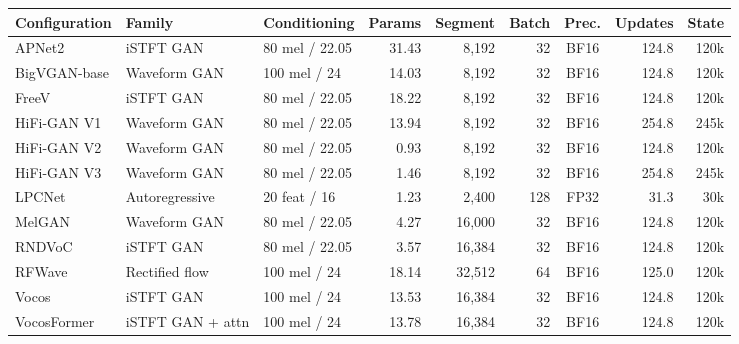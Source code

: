 \begin{tabular*}{\linewidth}{@{\extracolsep{\fill}}lllrrrcrr@{}}
  \toprule
  Configuration & Family & Conditioning & Params & Segment & Batch & Prec. & Updates & State \\
  \midrule
  APNet2 & iSTFT GAN & 80 mel / 22.05 & 31.43 & 8,192 & 32 & BF16 & 124.8 & 120k \\
  BigVGAN-base & Waveform GAN & 100 mel / 24 & 14.03 & 8,192 & 32 & BF16 & 124.8 & 120k \\
  FreeV & iSTFT GAN & 80 mel / 22.05 & 18.22 & 8,192 & 32 & BF16 & 124.8 & 120k \\
  HiFi-GAN V1 & Waveform GAN & 80 mel / 22.05 & 13.94 & 8,192 & 32 & BF16 & 254.8 & 245k \\
  HiFi-GAN V2 & Waveform GAN & 80 mel / 22.05 & 0.93 & 8,192 & 32 & BF16 & 124.8 & 120k \\
  HiFi-GAN V3 & Waveform GAN & 80 mel / 22.05 & 1.46 & 8,192 & 32 & BF16 & 254.8 & 245k \\
  LPCNet & Autoregressive & 20 feat / 16 & 1.23 & 2,400 & 128 & FP32 & 31.3 & 30k \\
  MelGAN & Waveform GAN & 80 mel / 22.05 & 4.27 & 16,000 & 32 & BF16 & 124.8 & 120k \\
  RNDVoC & iSTFT GAN & 80 mel / 22.05 & 3.57 & 16,384 & 32 & BF16 & 124.8 & 120k \\
  RFWave & Rectified flow & 100 mel / 24 & 18.14 & 32,512 & 64 & BF16 & 125.0 & 120k \\
  Vocos & iSTFT GAN & 100 mel / 24 & 13.53 & 16,384 & 32 & BF16 & 124.8 & 120k \\
  VocosFormer & iSTFT GAN + attn & 100 mel / 24 & 13.78 & 16,384 & 32 & BF16 & 124.8 & 120k \\
  \bottomrule
\end{tabular*}
